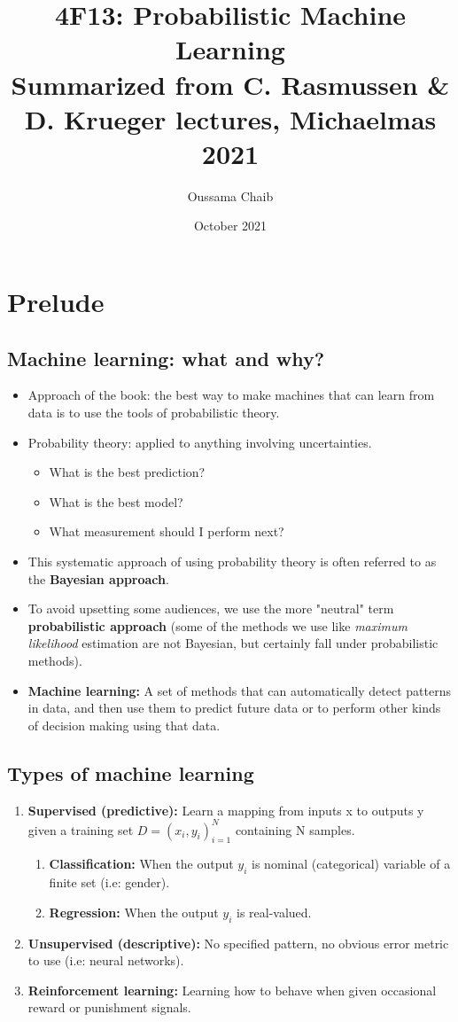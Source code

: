 \documentclass[a4paper,11pt]{article}
\title{%
	4F13: Probabilistic Machine Learning \\
	\vspace{10pt}
	\small Summarized from C. Rasmussen \& D. Krueger lectures, Michaelmas 2021}
\author{\small Oussama Chaib}
\date{\small October 2021}
\begin{document}
	\maketitle
	\tableofcontents
	\pagebreak
	\section{Prelude}
		\subsection{Machine learning: what and why?}
	\begin{itemize}
		\item Approach of the book: the best way to make machines that can learn from data is to use the tools of probabilistic theory.
		\item Probability theory: applied to anything involving uncertainties.
		\begin{itemize}
			\item What is the best prediction?
			\item What is the best model?
			\item What measurement should I perform next?
		\end{itemize}
		\item This systematic approach of using probability theory is often referred to as the \textbf{Bayesian approach}.
		\item To avoid upsetting some audiences, we use the more "neutral" term \textbf{probabilistic approach} (some of the methods we use like \textit{maximum likelihood} estimation are not Bayesian, but certainly fall under probabilistic methods).
		\item \textbf{Machine learning:} A set of methods that can automatically detect patterns in data, and then use them to predict future data or to perform other kinds of decision making using that data.
	\end{itemize}
	
	\subsection{Types of machine learning}
	\begin{enumerate}
		\item \textbf{Supervised (predictive):} Learn a mapping from inputs x to outputs y given a training set $D={(x_i,y_i)}_{i=1}^N$ containing N samples.
		\begin{enumerate}
			\item \textbf{Classification:} When the output $y_i$ is nominal (categorical) variable of a finite set (i.e: gender).
			\item \textbf{Regression:} When the output $y_i$ is real-valued.
		\end{enumerate}
		\item \textbf{Unsupervised (descriptive):} No specified pattern, no obvious error metric to use (i.e: neural networks).
		\item \textbf{Reinforcement learning:} Learning how to behave when given occasional reward or punishment signals.
	\end{enumerate}
	
\end{document}
